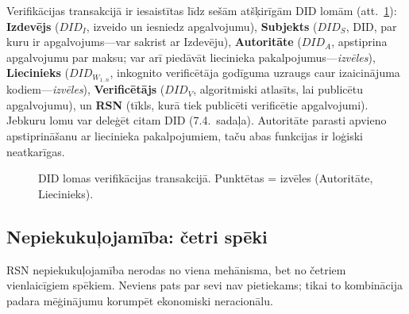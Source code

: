 \documentclass[11pt,a4paper,twocolumn]{article}
\begin{document}
Verifikācijas transakcijā ir iesaistītas līdz sešām atšķirīgām DID lomām (att.~\ref{fig:roles}): \textbf{Izdevējs} ($DID_I$, izveido un iesniedz apgalvojumu), \textbf{Subjekts} ($DID_S$, DID, par kuru ir apgalvojums---var sakrist ar Izdevēju), \textbf{Autoritāte} ($DID_A$, apstiprina apgalvojumu par maksu; var arī piedāvāt liecinieka pakalpojumus---\emph{izvēles}), \textbf{Liecinieks} ($DID_{W_{1..n}}$, inkognito verificētāja godīguma uzraugs caur izaicinājuma kodiem---\emph{izvēles}), \textbf{Verificētājs} ($DID_V$, algoritmiski atlasīts, lai publicētu apgalvojumu), un \textbf{RSN} (tīkls, kurā tiek publicēti verificētie apgalvojumi). Jebkuru lomu var deleģēt citam DID (7.4.\ sadaļa). Autoritāte parasti apvieno apstiprināšanu ar liecinieka pakalpojumiem, taču abas funkcijas ir loģiski neatkarīgas.

\begin{figure}[ht]
\centering
{}
\caption{DID lomas verifikācijas transakcijā. Punktētas = izvēles (Autoritāte, Liecinieks).}
\label{fig:roles}
\end{figure}

\subsection{Nepiekukuļojamība: četri spēki}

RSN nepiekukuļojamība nerodas no viena mehānisma, bet no četriem vienlaicīgiem spēkiem. Neviens pats par sevi nav pietiekams; tikai to kombinācija padara mēģinājumu korumpēt ekonomiski neracionālu.
\end{document}
